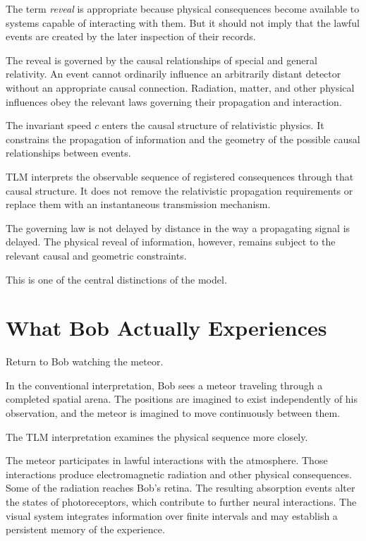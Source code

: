 \documentclass[12pt,onecolumn]{article}
\begin{document}
The term \emph{reveal} is appropriate because physical consequences become available to systems capable of interacting with them. But it should not imply that the lawful events are created by the later inspection of their records.

The reveal is governed by the causal relationships of special and general relativity. An event cannot ordinarily influence an arbitrarily distant detector without an appropriate causal connection. Radiation, matter, and other physical influences obey the relevant laws governing their propagation and interaction.

The invariant speed $c$ enters the causal structure of relativistic physics. It constrains the propagation of information and the geometry of the possible causal relationships between events.

TLM interprets the observable sequence of registered consequences through that causal structure. It does not remove the relativistic propagation requirements or replace them with an instantaneous transmission mechanism.

The governing law is not delayed by distance in the way a propagating signal is delayed. The physical reveal of information, however, remains subject to the relevant causal and geometric constraints.

This is one of the central distinctions of the model.

\section{What Bob Actually Experiences}

Return to Bob watching the meteor.

In the conventional interpretation, Bob sees a meteor traveling through a completed spatial arena. The positions are imagined to exist independently of his observation, and the meteor is imagined to move continuously between them.

The TLM interpretation examines the physical sequence more closely.

The meteor participates in lawful interactions with the atmosphere. Those interactions produce electromagnetic radiation and other physical consequences. Some of the radiation reaches Bob's retina. The resulting absorption events alter the states of photoreceptors, which contribute to further neural interactions. The visual system integrates information over finite intervals and may establish a persistent memory of the experience.
\end{document}
